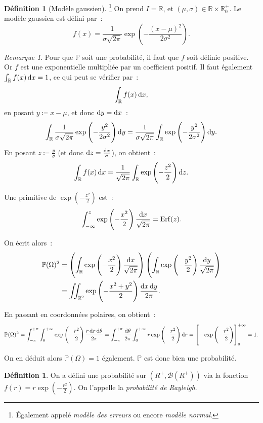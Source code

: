 \documentclass{article}
\renewcommand{\P}{\mathbb P}
\newcommand{\R}{\mathbb R}
\DeclareMathOperator{\Erf}{Erf}
\theoremstyle{definition}
\newtheorem{déf}[thm]{Définition}
\theoremstyle{remark}
\newtheorem*{rmq}{Remarque}
\begin{document}
		\begin{déf}[Modèle gaussien]\footnote{Également appelé \emph{modèle des erreurs} ou encore \textit{modèle normal}.} On prend $I = \R$, et
		$(\mu, \sigma) \in \R \times \R^+_0$. Le modèle gaussien est défini par~:
		\[f(x) = \frac 1{\sigma\sqrt{2\pi}}\exp\left(-\frac {(x-\mu)^2}{2\sigma^2}\right).\]
		\end{déf}

		\begin{rmq} Pour que $\P$ soit une probabilité, il faut que $f$ soit définie positive. Or $f$ est une exponentielle multipliée par un coefficient
		positif. Il faut également $\int_\R f(x)\dif x = 1$, ce qui peut se vérifier par~:
		\[\int_\R f(x)\dif x,\]
		en posant $y \coloneqq x-\mu$, et donc $\dif y = \dif x$~:
		\[\int_\R \frac 1{\sigma \sqrt{2\pi}}\exp\left(-\frac {y^2}{2\sigma^2}\right)\dif y
			= \frac 1{\sigma\sqrt{2\pi}}\int_\R\exp\left(-\frac {y^2}{2\sigma^2}\right)\dif y.\]
		En posant $z \coloneqq \frac y\sigma$ (et donc $\dif z = \frac {\dif x}\sigma$), on obtient~:
		\[\int_\R f(x)\dif x = \frac 1{\sqrt{2\pi}}\int_\R\exp\left(-\frac {z^2}2\right)\dif z.\]

		Une primitive de $\exp\left(-\frac {z^2}2\right)$ est~:
		\[\int_{-\infty}^z\exp\left(-\frac {x^2}2\right)\frac {\dif x}{\sqrt{2\pi}} = \Erf(z).\]

		On écrit alors~:
		\[\begin{aligned}
			\P(\Omega)^2 &= \left(\int_\R\exp\left(-\frac {x^2}2\right)\frac {\dif x}{\sqrt{2\pi}}\right)
			                \left(\int_\R\exp\left(-\frac {y^2}2\right)\frac {\dif y}{\sqrt{2\pi}}\right) \\
			             &= \iint_{\R^2}\exp\left(-\frac {x^2+y^2}2\right)\frac {\dif x\dif y}{2\pi}.
		\end{aligned}\]

		En passant en coordonnées polaires, on obtient~:
		\[\P(\Omega)^2 = \int_{-\pi}^{+\pi}\int_0^{+\infty}\exp\left(-\frac {r^2}2\right)\frac {r\dif r\dif \theta}{2\pi}
		= \int_{-\pi}^{+\pi}\frac {\dif \theta}{2\pi}\int_0^{+\infty} r\exp\left(-\frac {r^2}2\right)\dif r
		= \left[-\exp\left(-\frac {r^2}2\right)\right]_0^{+\infty} = 1.\]

		On en déduit alors $\P(\Omega) = 1$ également. $\P$ est donc bien une probabilité. \end{rmq}

		\begin{déf} On a défini une probabilité sur $\left(R^+, \mathcal B(R^+)\right)$ via la fonction $f(r) = r\exp\left(-\frac {r^2}2\right)$.
		On l'appelle la \emph{probabilité de Rayleigh}. \end{déf}
\end{document}

